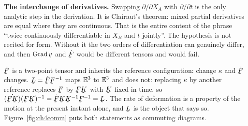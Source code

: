 \begin{remark}
\textbf{The interchange of derivatives.} Swapping $\partial/\partial
X_{A}$ with $\partial/\partial t$ is the only analytic step in the
derivation. It is Clairaut's theorem: mixed partial derivatives are equal
where they are continuous. That is the entire content of the phrase
``twice continuously differentiable in $X_{B}$ and $t$ jointly''. The
hypothesis is not recited for form. Without it the two orders of
differentiation can genuinely differ, and then $\Grad\bv$ and $\dot\bF$
would be different tensors and  would fail.
\end{remark}

\begin{remark}\label{rem:whyL}
$\dot\bF$ is a two-point tensor and inherits the reference configuration:
change $\kappa$ and $\dot\bF$ changes. $\bL=\dot\bF\bF^{-1}$ maps $\mathbb{E}^{3}$ to
$\mathbb{E}^{3}$ and does not: replacing $\kappa$ by another reference replaces $\bF$
by $\bF\bK$ with $\bK$ fixed in time, so
$\dot{(\bF\bK)}(\bF\bK)^{-1}=\dot\bF\bK\bK^{-1}\bF^{-1}=\bL$. The rate of
deformation is a property of the motion at the present instant alone, and
$\bL$ is the object that says so. Figure~\ref{fig:ch4comm} puts both
statements as commuting diagrams.
\end{remark}

